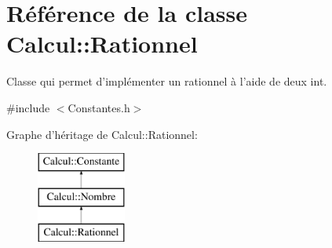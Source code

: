 \hypertarget{class_calcul_1_1_rationnel}{\section{Référence de la classe Calcul\-:\-:Rationnel}
\label{class_calcul_1_1_rationnel}
}


Classe qui permet d'implémenter un rationnel à l'aide de deux int.  




{\ttfamily \#include $<$Constantes.\-h$>$}

Graphe d'héritage de Calcul\-:\-:Rationnel\-:\begin{figure}[H]
\begin{center}
\leavevmode
\includegraphics[height=3.000000cm]{class_calcul_1_1_rationnel}
\end{center}
\end{figure}
